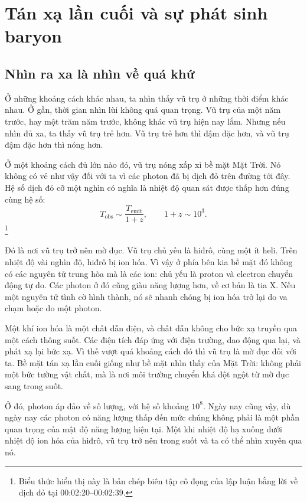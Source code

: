 \chapter{Tán xạ lần cuối và sự phát sinh baryon}

\section{Nhìn ra xa là nhìn về quá khứ}

Ở những khoảng cách khác nhau, ta nhìn thấy vũ trụ ở những thời điểm khác nhau. Ở gần, thời gian nhìn lùi không quá quan trọng. Vũ trụ của một năm trước, hay một trăm năm trước, không khác vũ trụ hiện nay lắm. Nhưng nếu nhìn đủ xa, ta thấy vũ trụ trẻ hơn. Vũ trụ trẻ hơn thì đậm đặc hơn, và vũ trụ đậm đặc hơn thì nóng hơn.

Ở một khoảng cách đủ lớn nào đó, vũ trụ nóng xấp xỉ bề mặt Mặt Trời. Nó không có vẻ như vậy đối với ta vì các photon đã bị dịch đỏ trên đường tới đây. Hệ số dịch đỏ cỡ một nghìn có nghĩa là nhiệt độ quan sát được thấp hơn đúng cùng hệ số:
\[
T_{\mathrm{obs}} \sim \frac{T_{\mathrm{emit}}}{1+z},
\qquad
1+z \sim 10^3.
\]\footnote{Biểu thức hiển thị này là bản chép biên tập cô đọng của lập luận bằng lời về dịch đỏ tại 00:02:20--00:02:39.}

Đó là nơi vũ trụ trở nên mờ đục. Vũ trụ chủ yếu là hiđrô, cùng một ít heli. Trên nhiệt độ vài nghìn độ, hiđrô bị ion hóa. Vì vậy ở phía bên kia bề mặt đó không có các nguyên tử trung hòa mà là các ion: chủ yếu là proton và electron chuyển động tự do. Các photon ở đó cũng giàu năng lượng hơn, về cơ bản là tia X. Nếu một nguyên tử tình cờ hình thành, nó sẽ nhanh chóng bị ion hóa trở lại do va chạm hoặc do một photon.

Một khí ion hóa là một chất dẫn điện, và chất dẫn không cho bức xạ truyền qua một cách thông suốt. Các điện tích đáp ứng với điện trường, dao động qua lại, và phát xạ lại bức xạ. Vì thế vượt quá khoảng cách đó thì vũ trụ là mờ đục đối với ta. Bề mặt tán xạ lần cuối giống như bề mặt nhìn thấy của Mặt Trời: không phải một bức tường vật chất, mà là nơi môi trường chuyển khá đột ngột từ mờ đục sang trong suốt.

Ở đó, photon áp đảo về số lượng, với hệ số khoảng \(10^8\). Ngày nay cũng vậy, dù ngày nay các photon có năng lượng thấp đến mức chúng không phải là một phần quan trọng của mật độ năng lượng hiện tại. Một khi nhiệt độ hạ xuống dưới nhiệt độ ion hóa của hiđrô, vũ trụ trở nên trong suốt và ta có thể nhìn xuyên qua nó.

